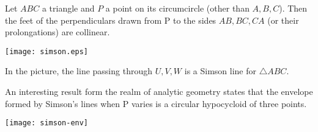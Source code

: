 \documentclass{article}
\begin{document}
Let $ABC$ a triangle and $P$ a point on its circumcircle (other than $A,B,C$).
Then the feet of the perpendiculars drawn from P to the sides $AB,BC,CA$ (or their prolongations) are collinear.

\begin{center}
\texttt{[image: simson.eps]}
\end{center}

In the picture, the line passing through $U,V,W$ is a Simson line for $\triangle ABC$.

An interesting result form the realm of analytic geometry states that the envelope formed by Simson's lines when P  varies is a circular hypocycloid of three points.

\begin{center}
\texttt{[image: simson-env]}
\end{center}
\end{document}
